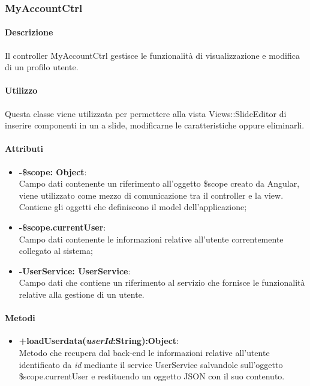 \newpage	
\subsubsection{MyAccountCtrl}
	\paragraph{Descrizione}
	Il controller MyAccountCtrl gestisce le funzionalità di visualizzazione e modifica di un profilo utente.
	
	\paragraph{Utilizzo}
	Questa classe viene utilizzata per permettere alla vista Views::SlideEditor di inserire componenti in un a slide, modificarne le caratteristiche oppure eliminarli.\\
	\paragraph{Attributi}
	\begin{itemize}
		\item \textbf{-\$scope: Object}:\\
			Campo dati contenente un riferimento all'oggetto \$scope creato da Angular, viene utilizzato come mezzo di comunicazione tra il controller e la view. Contiene gli oggetti che definiscono il model dell'applicazione;	
		\item \textbf{-\$scope.currentUser}:\\
			Campo dati contenente le informazioni relative all'utente correntemente collegato al sistema;
				
		\item \textbf{-UserService: UserService}:\\
			Campo dati che contiene un riferimento al servizio che fornisce le funzionalità relative alla gestione di un utente.
	
	\end{itemize}
	
	\paragraph{Metodi}
	\begin{itemize}
	  \item \textbf{+loadUserdata(\textit{userId}:String):Object}:\\
		 Metodo che recupera dal back-end le informazioni relative all'utente identificato da \textit{id} mediante il service UserService salvandole sull'oggetto \$scope.currentUser e restituendo un oggetto JSON con il suo contenuto.
	\end{itemize}
